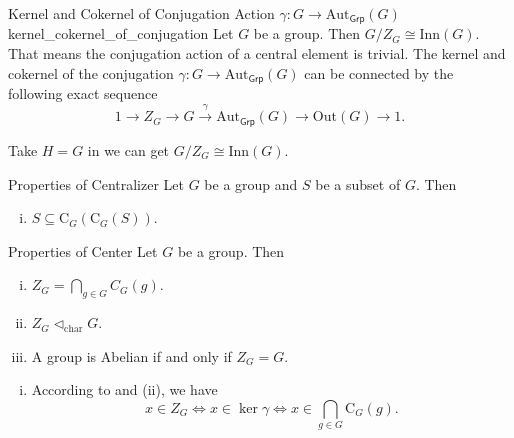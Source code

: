\begin{corollary}{Kernel and Cokernel of Conjugation Action $\gamma:G\to \mathrm{Aut}_{\mathsf{Grp}}(G)$}{kernel_cokernel_of_conjugation}
    Let $G$ be a group. Then $G/Z_G\cong \mathrm{Inn}(G)$. That means the conjugation action of a central element is trivial. The kernel and cokernel of the conjugation $\gamma:G\to \mathrm{Aut}_{\mathsf{Grp}}(G)$ can be connected by the following exact sequence
    \[
        1\longrightarrow Z_G\longrightarrow G\xrightarrow{\hspace{5pt}\gamma\hspace{5pt}}\mathrm{Aut}_{\mathsf{Grp}}(G)\longrightarrow \mathrm{Out}(G)\longrightarrow 1.
    \]
\end{corollary}

\begin{prf}
    Take $H=G$ in  we can get $G/Z_G\cong \mathrm{Inn}(G)$.
\end{prf}





\begin{proposition}{Properties of Centralizer}{}
    Let $G$ be a group and $S$ be a subset of $G$. Then
    \begin{enumerate}[(i)]
        \item $S\subseteq\mathrm{C}_G(\mathrm{C}_G(S))$.
    \end{enumerate}
\end{proposition}

\begin{proposition}{Properties of Center}{}
    Let $G$ be a group. Then
    \begin{enumerate}[(i)]
        \item $Z_G=\bigcap_{g \in G} C_G(g)$.
        \item $Z_G\lhd_{\mathrm{char}} G$.
        \item A group is Abelian if and only if $Z_G=G$.
    \end{enumerate}
\end{proposition}
\begin{prf}
    \begin{enumerate}[(i)]
        \item According to  and  (ii), we have
              \[
                  x\in Z_G\iff x\in \ker \gamma\iff x\in
                  \bigcap\limits_{g\in G}\mathrm{C}_G(g).
              \]
    \end{enumerate}
\end{prf}

